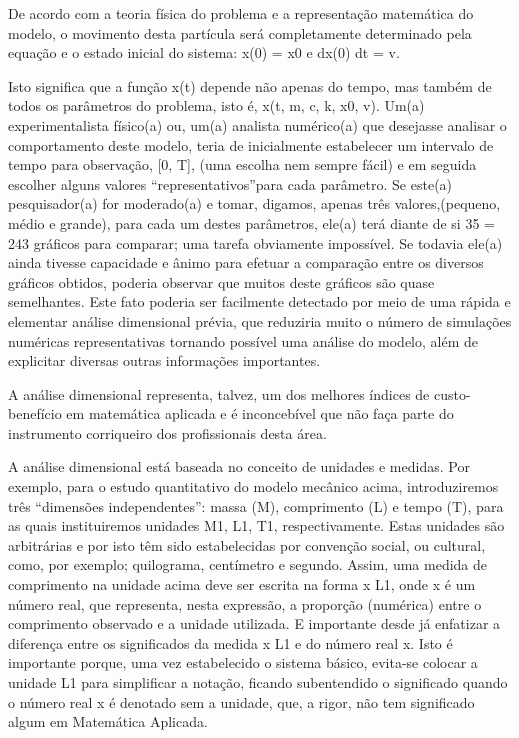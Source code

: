 De acordo com a teoria física do problema e a representação matemática do modelo, o movimento desta partícula será completamente determinado pela equação e o estado inicial do sistema: x(0) = x0 e
dx(0) dt = v.

Isto significa que a função x(t) depende não apenas do tempo, mas também de todos os parâmetros do problema, isto é, x(t, m, c, k, x0, v). Um(a) experimentalista físico(a) ou, um(a) analista numérico(a) que desejasse analisar o comportamento deste modelo, teria de inicialmente estabelecer um intervalo de tempo para observação, [0, T], (uma escolha nem sempre fácil) e em seguida  escolher alguns valores “representativos”para cada parâmetro. Se este(a) pesquisador(a) for moderado(a) e tomar, digamos, apenas três valores,(pequeno, médio e grande), para cada um destes parâmetros, ele(a) terá diante de si 35 = 243 gráficos para comparar; uma tarefa obviamente impossível. Se todavia ele(a) ainda tivesse capacidade e ânimo para efetuar a comparação entre os diversos gráficos obtidos, poderia observar que muitos deste gráficos são quase semelhantes. Este fato poderia ser facilmente detectado por meio de uma rápida e elementar análise dimensional prévia, que reduziria muito o número de simulações numéricas representativas tornando possível uma análise do modelo, além de explicitar diversas outras informações importantes.

A análise dimensional representa, talvez, um dos melhores índices de custo-benefício em matemática aplicada e é inconcebível que não faça parte do instrumento corriqueiro dos profissionais desta área.

A análise dimensional está baseada no conceito de unidades e medidas. Por exemplo, para o estudo quantitativo do modelo mecânico acima, introduziremos três “dimensões independentes”: massa (M), comprimento (L) e tempo (T), para as quais instituiremos unidades M1, L1, T1, respectivamente. Estas unidades são arbitrárias e por isto têm sido estabelecidas por convenção social, ou cultural, como, por exemplo; quilograma, centímetro e segundo. Assim, uma medida de comprimento na unidade acima deve ser escrita na forma x L1, onde x é um número real, que representa, nesta expressão, a proporção (numérica) entre o comprimento observado e a unidade utilizada. E importante desde já enfatizar a diferença entre os significados da medida x L1 e do número real x. Isto é importante porque, uma vez estabelecido o sistema básico, evita-se colocar a unidade L1 para simplificar a notação, ficando subentendido o significado quando o número real x é denotado sem a unidade, que, a rigor, não tem significado algum em Matemática Aplicada.

